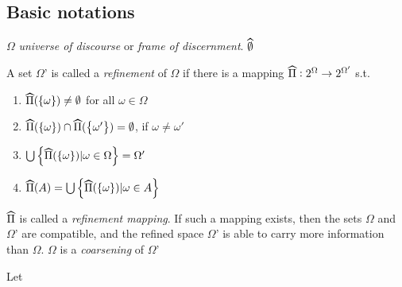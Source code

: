 \documentclass[11pt]{article}
\begin{document}
\subsection{Basic notations}
\label{sec:orga7c16de}
\(\Omega\) \emph{universe of discourse} or \emph{frame of discernment}.
\(\what{\emptyset}\)
\begin{definition}[]
A set \(\Omega\)' is called a \emph{refinement} of \(\Omega\) if there is a mapping 
\(\what{\Pi}:2^\Omega\to 2^{\Omega'}\) s.t.
\begin{enumerate}
\item \(\what{\Pi}(\lb\omega\rb)\neq\emptyset\) for all \(\omega\in\Omega\)
\item \(\what{\Pi}(\lb\omega\rb)\cap\what{\Pi}(\lb\omega'\rb)=\emptyset\), if
\(\omega\neq\omega'\)
\item \(\bigcup\lb\what{\Pi}(\lb\omega\rb)|\omega\in\Omega\rb=\Omega'\)
\item \(\what{\Pi}(A)=\bigcup\lb\what{\Pi}(\lb\omega\rb)|\omega\in A\rb\)
\end{enumerate}
\end{definition}
\(\what{\Pi}\) is called a \emph{refinement mapping}. If such a mapping exists, then
the sets \(\Omega\) and \(\Omega\)' are compatible, and the refined space \(\Omega\)' is
able to carry more information than \(\Omega\). \(\Omega\) is a \emph{coarsening} of \(\Omega\)'

\begin{definition}[]
Let 
\end{definition}
\end{document}
